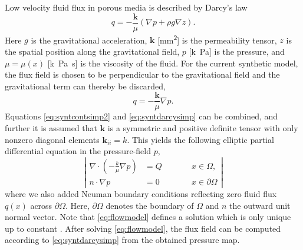 \documentclass[paper=a4, fontsize=11pt,parskip=half,headings=small]{scrartcl}
\newcommand{\simu}{k\pascal\second}
\begin{document}
	Low velocity fluid flux in porous media is described by Darcy's law \cite{Darcy56}
	\begin{equation}
		q = -\frac{\mathbf{k}}{\mu} \left( \nabla p + \rho g  \nabla z \right).
	\end{equation}
	Here $g$ is the gravitational acceleration, $\mathbf{k}$ [\si{\square\milli\meter}] is the permeability tensor, $z$ is the spatial position along the gravitational field, $p$ [\si{k\pascal}] is the pressure, and $\mu = \mu(x)$ [\si{\simu}] is the viscosity of the fluid. 
	For the current synthetic model, the flux field is chosen to be perpendicular to the gravitational field and the gravitational term can thereby be discarded,
	\begin{equation}
		q = -\frac{\mathbf{k}}{\mu} \nabla p.
		\label{eq:syntdarcysimp}
	\end{equation}
	Equations \eqref{eq:syntcontsimp2} and \eqref{eq:syntdarcysimp} can be combined, and further it is assumed that $\mathbf{k}$ is a symmetric and positive definite tensor with only nonzero diagonal elements $\mathbf{k}_{ii} = k$.
	This yields the following elliptic partial differential equation in the pressure-field $p$,
	\begin{equation}
		\left\vert
		\begin{alignedat}{2}
			\nabla \cdot \left( -\frac{k}{\mu} \nabla p \right) &= Q  \qquad &&x \in \Omega, \\
			n \cdot \nabla p &=0 &&x \in \partial \Omega
		\end{alignedat}
		\right\vert 
		\label{eq:flowmodel}
	\end{equation}
	where we also added Neuman boundary conditions reflecting zero fluid flux $q(x)$ across $\partial \Omega$.
	Here, $\partial \Omega$ denotes the boundary of $\Omega$ and $n$ the outward unit normal vector. 
	Note that \eqref{eq:flowmodel} defines a solution which is only unique up to constant \cite{evans98}.
	After solving \eqref{eq:flowmodel}, the flux field can be computed according to \eqref{eq:syntdarcysimp} from the obtained pressure map. 
	
	
\end{document}
